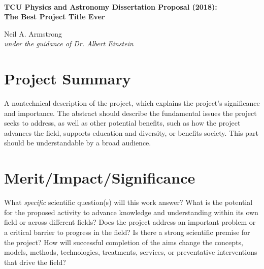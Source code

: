 \documentclass[11pt, preprint, flushrt]{aastex-numbers}
\begin{document}
~
\vspace{-0.4in}
\setlength{\baselineskip}{14.0pt}

\begin{center}
{\large \bf TCU Physics and Astronomy Dissertation Proposal (2018):}\\
{\large  \bf  The Best Project Title Ever}
\vskip0.1in


{\large Neil A. Armstrong}\\
{\it under the guidance of Dr. Albert Einstein\\}
\end{center}


\section{Project Summary}\vskip-0.05in

 A nontechnical description of the project, which explains the
 project's significance and importance. The abstract should describe
 the fundamental issues the project seeks to address, as well as other
 potential benefits, such as how the project advances the field,
 supports education and diversity, or benefits society. This part
 should be understandable by a broad audience. 


\vskip1.5in


\vspace{-0.2in}
\section{Merit/Impact/Significance}\vskip-0.05in

 What {\it specific} scientific question(s) will this work answer?
 What is the potential for the proposed activity to advance knowledge
 and understanding within its own field or across different fields?
 Does the project address an important problem or a critical barrier
 to progress in the field? Is there a strong scientific premise for
 the project? How will successful completion of the aims change the
 concepts, models, methods, technologies, treatments, services, or
 preventative interventions that drive the field? 
\end{document}
